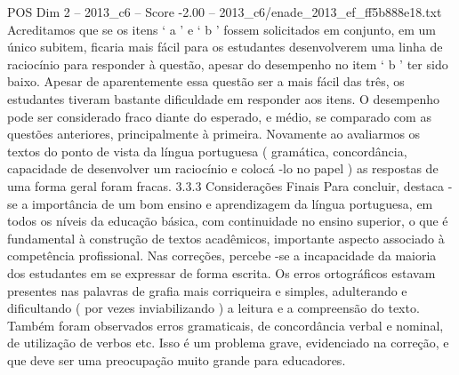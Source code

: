 \begin{textsample}{POS Dim 2 – 2013\_c6 – Score -2.00 – 2013\_c6/enade\_2013\_ef\_ff5b888e18.txt}
Acreditamos que se os itens ‘ a ’ e ‘ b ’ fossem solicitados em conjunto, em um único subitem, ficaria mais fácil para os estudantes desenvolverem uma linha de raciocínio para responder à questão, apesar do desempenho no item ‘ b ’ ter sido baixo.
Apesar de aparentemente essa questão ser a mais fácil das três, os estudantes tiveram bastante dificuldade em responder aos itens.
O desempenho pode ser considerado fraco diante do esperado, e médio, se comparado com as questões anteriores, principalmente à primeira.
Novamente ao avaliarmos os textos do ponto de vista da língua portuguesa ( gramática, concordância, capacidade de desenvolver um raciocínio e colocá -lo no papel ) as respostas de uma forma geral foram fracas. 3.3.3 Considerações Finais Para concluir, destaca -se a importância de um bom ensino e aprendizagem da língua portuguesa, em todos os níveis da educação básica, com continuidade no ensino superior, o que é fundamental à construção de textos acadêmicos, importante aspecto associado à competência profissional.
Nas correções, percebe -se a incapacidade da maioria dos estudantes em se expressar de forma escrita.
Os erros ortográficos estavam presentes nas palavras de grafia mais corriqueira e simples, adulterando e dificultando ( por vezes inviabilizando ) a leitura e a compreensão do texto.
Também foram observados erros gramaticais, de concordância verbal e nominal, de utilização de verbos etc.
Isso é um problema grave, evidenciado na correção, e que deve ser uma preocupação muito grande para educadores.

\end{textsample}

